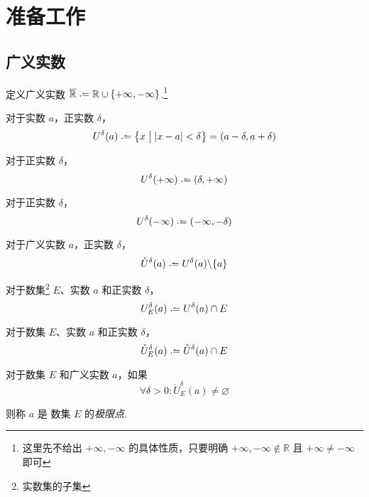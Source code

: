 \section{准备工作}
\subsection{广义实数}
\begin{definition}
    定义广义实数 $\overline{\mathbb{R}} \defeq \mathbb{R} \cup \{+\infty, -\infty\}$.\footnote{这里先不给出 $+\infty, -\infty$ 的具体性质，只要明确 $+\infty, -\infty \notin \mathbb{R}$ 且 $+\infty \neq -\infty$ 即可}
\end{definition}\vspace{9pt}

\begin{subdefinition}
    对于实数 $a$，正实数 $\delta$，
    \[U^\delta(a) \defeq \bigl\{x \bigm| \lvert x - a \rvert < \delta \bigr\} = (a-\delta, a+\delta)\]
\end{subdefinition}

\begin{subdefinition}
    对于正实数 $\delta$，
    \[U^\delta(+\infty) \defeq (\delta , +\infty)\]
\end{subdefinition}

\begin{subdefinition}
    对于正实数 $\delta$，
    \[U^\delta(-\infty) \defeq (-\infty, -\delta)\]
\end{subdefinition}

\begin{subdefinition}
    对于广义实数 $a$，正实数 $\delta$，
    \[\mathring{U}^\delta(a) \defeq U^\delta(a) \backslash \{a\}\]
\end{subdefinition}

\begin{subdefinition}
    对于数集\footnote{实数集的子集} $E$、实数 $a$ 和正实数 $\delta$，
    \[U_E^\delta(a) \defeq U^\delta(a) \cap E\]
\end{subdefinition}

\begin{subdefinition}
    对于数集 $E$、实数 $a$ 和正实数 $\delta$，
    \[\mathring{U}_E^\delta(a) \defeq \mathring{U}^\delta(a) \cap E\]
\end{subdefinition}\vspace{9pt}

\begin{definition}
    对于数集 $E$ 和广义实数 $a$，如果
    \[\forall \delta > 0: \mathring{U}_E^\delta(a) \neq \varnothing\]

    则称 $a$ 是 数集 $E$ 的\emph{极限点}.
\end{definition}

